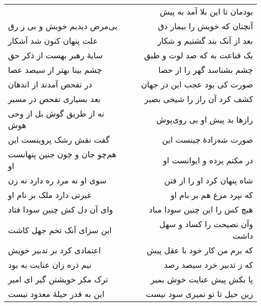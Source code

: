 \begin{center}
\begin{longtable}{l p{0.5cm} r}
&&
بودمان تا این بلا آمد به پیش
\\
بی‌مرض دیدیم خویش و بی ز رق
&&
آنچنان که خویش را بیمار دق
\\
علت پنهان کنون شد آشکار
&&
بعد از آنک بند گشتیم و شکار
\\
سایهٔ رهبر بهست از ذکر حق
&&
یک قناعت به که صد لوت و طبق
\\
چشم بینا بهتر از سیصد عصا
&&
چشم بشناسد گهر را از حصا
\\
در تفحص آمدند از اندهان
&&
صورت کی بود عجب این در جهان
\\
بعد بسیاری تفحص در مسیر
&&
کشف کرد آن راز را شیخی بصیر
\\
نه از طریق گوش بل از وحی هوش
&&
رازها بد پیش او بی روی‌پوش
\\
گفت نقش رشک پروینست این
&&
صورت شه‌زادهٔ چینست این
\\
هم‌چو جان و چون جنین پنهانست او
&&
در مکتم پرده و ایوانست او
\\
سوی او نه مرد ره دارد نه زن
&&
شاه پنهان کرد او را از فتن
\\
غیرتی دارد ملک بر نام او
&&
که نپرد مرغ هم بر بام او
\\
وای آن دل کش چنین سودا فتاد
&&
هیچ کس را این چنین سودا مباد
\\
این سزای آنک تخم جهل کاشت
&&
وآن نصیحت را کساد و سهل داشت
\\
اعتمادی کرد بر تدبیر خویش
&&
که برم من کار خود با عقل پیش
\\
نیم ذره زان عنایت به بود
&&
که ز تدبیر خرد سیصد رصد
\\
ترک مکر خویشتن گیر ای امیر
&&
پا بکش پیش عنایت خوش بمیر
\\
این به قدر حیلهٔ معدود نیست
&&
زین حیل تا تو نمیری سود نیست
\\
\end{longtable}
\end{center}

